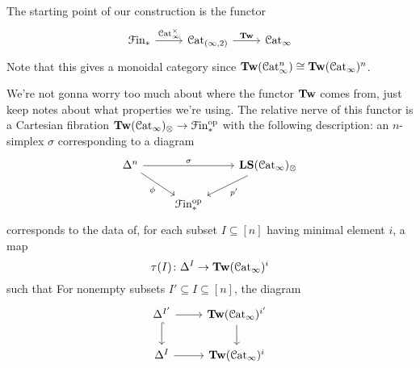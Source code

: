 \documentclass[main.tex]{subfiles}
\begin{document}
The starting point of our construction is the functor
\begin{equation*}
  \begin{tikzcd}
    \Finp
    \arrow[r, "\ICat^{\times}"]
    & \Cat_{(\infty, 2)}
    \arrow[r, "\Tw"]
    & \ICat
  \end{tikzcd}
\end{equation*}
Note that this gives a monoidal category since $\mathbf{Tw}(\mathcal{C}\mathrm{at}_{\infty}^{n})\cong \mathbf{Tw}(\mathcal{C}\mathrm{at}_{\infty})^{n}$.

We're not gonna worry too much about where the functor $\mathbf{Tw}$ comes from, just keep notes about what properties we're using. The relative nerve of this functor is a Cartesian fibration $\mathbf{Tw}(\mathcal{C}\mathrm{at}_{\infty})_{\otimes} \to \mathcal{F}\mathrm{in}_{*}^{\mathrm{op}}$ with the following description: an $n$-simplex $\sigma$ corresponding to a diagram
\begin{equation*}
  \begin{tikzcd}
    \Delta^{n}
    \arrow[rr, "\sigma"]
    \arrow[dr, swap, "\phi"]
    && \LS(\ICat)_{\otimes}
    \arrow[dl, "p'"]
    \\
    & \Finp\op
  \end{tikzcd}
\end{equation*}
corresponds to the data of, for each subset $I \subseteq [n]$ having minimal element $i$, a map
\begin{equation*}
  \tau(I)\colon \Delta^{I} \to \mathbf{Tw}(\mathcal{C}\mathrm{at}_{\infty})^{i}
\end{equation*}
such that For nonempty subsets $I' \subseteq I \subseteq [n]$, the diagram
\begin{equation*}
  \begin{tikzcd}
    \Delta^{I'}
    \arrow[r]
    \arrow[d, hook]
    & \Tw(\ICat)^{i'}
    \arrow[d]
    \\
    \Delta^{I}
    \arrow[r]
    & \Tw(\ICat)^{i}
  \end{tikzcd}
\end{equation*}
\end{document}
